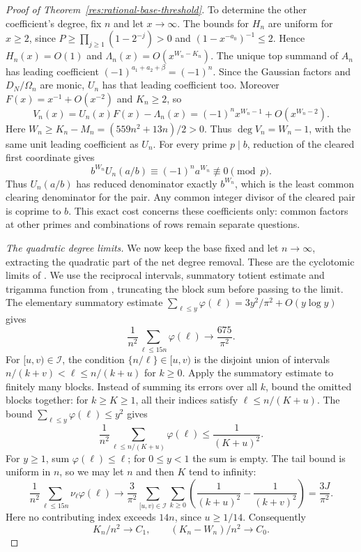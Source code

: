 \documentclass[11pt]{article}
\begin{document}
\begin{proof}[Proof of Theorem~\ref{res:rational-base-threshold}]
To determine the other coefficient's degree, fix $n$ and let
$x\to\infty$. The bounds for $H_n$ are uniform for $x\ge2$, since
$P\ge\prod_{j\ge1}(1-2^{-j})>0$ and $(1-x^{-a_0})^{-1}\le2$.
Hence $H_n(x)=O(1)$ and $\Lambda_n(x)=O(x^{W_n-K_n})$.
The unique top summand of $A_n$ has leading coefficient
$(-1)^{a_1+a_2+\beta}=(-1)^n$. Since the Gaussian factors and
$D_N/\Omega_n$ are monic, $U_n$ has that leading coefficient too.
Moreover $F(x)=x^{-1}+O(x^{-2})$ and $K_n\ge2$, so
\[
 V_n(x)=U_n(x)F(x)-\Lambda_n(x)
       =(-1)^n x^{W_n-1}+O(x^{W_n-2}).
\]
Here $W_n\ge K_n-M_n=(559n^2+13n)/2>0$. Thus
$\deg V_n=W_n-1$, with the same unit leading coefficient as $U_n$.
For every prime $p\mid b$, reduction of the cleared first coordinate gives
\[
 b^{W_n}U_n(a/b)\equiv(-1)^n a^{W_n}\not\equiv0\pmod p.
\]
Thus $U_n(a/b)$ has reduced denominator exactly $b^{W_n}$,
which is the least common clearing denominator for the pair.
Any common integer divisor of the cleared pair is coprime to $b$.
This exact cost concerns these coefficients only: common factors
at other primes and combinations of rows remain separate questions.

\emph{The quadratic degree limits.}
We now keep the base fixed and let $n\to\infty$, extracting the
quadratic part of the net degree removal. These are the cyclotomic
limits of \cite[Lemmas~1--2, p.~155]{zudilin2004}. We use the
reciprocal intervals, summatory totient estimate and trigamma
function from \cite[Lemma~1, p.~466]{zudilin2002}, truncating the
block sum before passing to the limit.
The elementary summatory estimate
$\sum_{\ell\le y}\varphi(\ell)=3y^2/\pi^2+O(y\log y)$ gives
\[
 \frac1{n^2}\sum_{\ell\le15n}\varphi(\ell)\longrightarrow\frac{675}{\pi^2}.
\]
For $[u,v)\in\mathcal I$, the condition $\{n/\ell\}\in[u,v)$ is the
disjoint union of intervals
$n/(k+v)<\ell\le n/(k+u)$ for $k\ge0$.
Apply the summatory estimate to finitely many blocks. Instead of
summing its errors over all $k$, bound the omitted blocks together:
for $k\ge K\ge1$, all their indices satisfy $\ell\le n/(K+u)$.
The bound $\sum_{\ell\le y}\varphi(\ell)\le y^2$ gives
\[
 \frac1{n^2}\sum_{\ell\le n/(K+u)}\varphi(\ell)
 \le\frac1{(K+u)^2}.
\]
For $y\ge1$, sum $\varphi(\ell)\le\ell$; for $0\le y<1$ the sum
is empty. The tail bound is uniform in $n$, so we may let $n$ and
then $K$ tend to infinity:
\[
 \frac1{n^2}\sum_{\ell\le15n}\nu_\ell\varphi(\ell)
 \longrightarrow\frac3{\pi^2}
 \sum_{[u,v)\in\mathcal I}\sum_{k\ge0}
 \left(\frac1{(k+u)^2}-\frac1{(k+v)^2}\right)=\frac{3J}{\pi^2}.
\]
Here no contributing index exceeds $14n$, since $u\ge1/14$.
Consequently
\[
 K_n/n^2\longrightarrow C_1,\qquad
 (K_n-W_n)/n^2\longrightarrow C_0.
\]


\end{proof}
\end{document}
